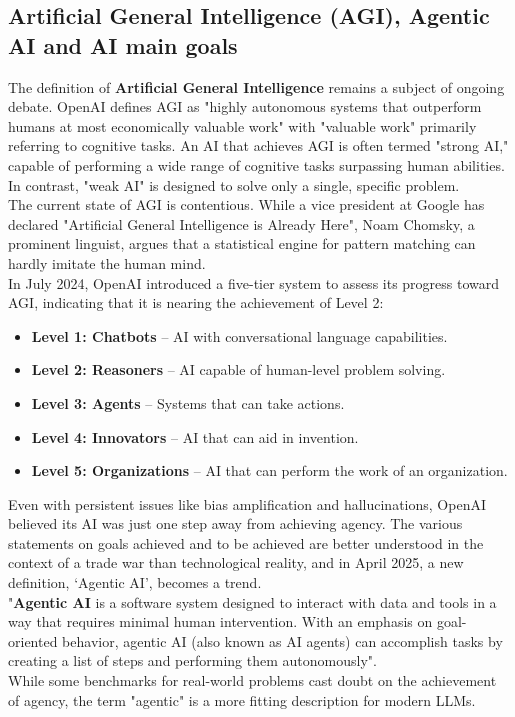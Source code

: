 \documentclass[12pt]{article}
\begin{document}
    \subsection{Artificial General Intelligence (AGI), Agentic AI and AI main goals}
    The definition of \textbf{Artificial General Intelligence} remains a subject of ongoing debate. OpenAI defines AGI as "highly autonomous systems that outperform humans at most economically valuable work"\cite{OpenAICharter} with "valuable work" primarily referring to cognitive tasks. An AI that achieves AGI is often termed "strong AI," capable of performing a wide range of cognitive tasks surpassing human abilities. In contrast, "weak AI" is designed to solve only a single, specific problem.\\
The current state of AGI is contentious. While a vice president at Google has declared "Artificial General Intelligence is Already Here",\cite{AGIOpenAI} Noam Chomsky, a prominent linguist, argues that a statistical engine for pattern matching can hardly imitate the human mind.\cite{Chomsky}\\
In July 2024, OpenAI introduced a five-tier system to assess its progress toward AGI,\cite{bloomberg5tier}\cite{arstechnica5tier} indicating that it is nearing the achievement of Level 2:
\begin{itemize}
    \item \textbf{Level 1: Chatbots} – AI with conversational language capabilities.
    \item \textbf{Level 2: Reasoners} – AI capable of human-level problem solving.
    \item \textbf{Level 3: Agents} – Systems that can take actions.
    \item \textbf{Level 4: Innovators} – AI that can aid in invention.
    \item \textbf{Level 5: Organizations} – AI that can perform the work of an organization.
\end{itemize}
Even with persistent issues like bias amplification and hallucinations, OpenAI believed its AI was just one step away from achieving agency.
The various statements on goals achieved and to be achieved are better understood in the context of a trade war than technological reality, and in April 2025, a new definition, ‘Agentic AI’, becomes a trend.\cite{AgenticAITrend}\\
"\textbf{Agentic AI} is a software system designed to interact with data and tools in a way that requires minimal human intervention. With an emphasis on goal-oriented behavior, agentic AI (also known as AI agents) can accomplish tasks by creating a list of steps and performing them autonomously".\cite{RedHatAgenticAI}\\
While some benchmarks for real-world problems cast doubt on the achievement of agency, the term "agentic" is a more fitting description for modern LLMs.
\end{document}
